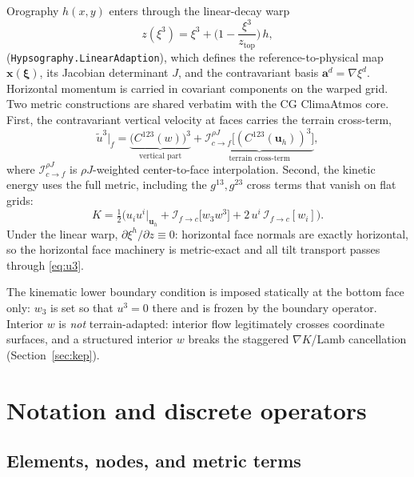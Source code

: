 \documentclass[11pt]{article}
\newcommand{\uu}{\boldsymbol{u}}
\newcommand{\uh}{\uu_h}
\begin{document}
Orography $h(x,y)$ enters through the linear-decay warp
\begin{equation}
z(\xi^3) = \xi^3 + \Big(1 - \frac{\xi^3}{z_{\mathrm{top}}}\Big)\,h,
\end{equation}
(\texttt{Hypsography.LinearAdaption}), which defines the reference-to-physical
map $\boldsymbol{x}(\boldsymbol{\xi})$, its Jacobian determinant $J$, and
the contravariant basis $\boldsymbol{a}^d = \nabla\xi^d$. Horizontal
momentum is carried in covariant components on the warped grid. Two
metric constructions are shared verbatim with the CG ClimaAtmos core.
First, the contravariant vertical velocity at faces carries the terrain
cross-term,
\begin{equation}
\tilde u^3\big|_f
 = \underbrace{\big(C^{123}(w)\big)^3}_{\text{vertical part}}
 + \underbrace{\mathcal{I}^{\rho J}_{c\to f}
   \big[(C^{123}(\uh))^3\big]}_{\text{terrain cross-term}},
\label{eq:u3}
\end{equation}
where $\mathcal{I}^{\rho J}_{c\to f}$ is $\rho J$-weighted center-to-face
interpolation. Second, the kinetic energy uses the full metric, including
the $g^{13}, g^{23}$ cross terms that vanish on flat grids:
\begin{equation}
K = \tfrac12\Big( u_i u^i \big|_{\uh}
 + \mathcal{I}_{f\to c}\big[w_3 w^3\big]
 + 2\, u^i \,\mathcal{I}_{f\to c}[w_i] \Big).
\label{eq:fullK}
\end{equation}
Under the linear warp, $\partial \xi^h/\partial z \equiv 0$: horizontal
face normals are exactly horizontal, so the horizontal face machinery is
metric-exact and all tilt transport passes through \eqref{eq:u3}.

The kinematic lower boundary condition is imposed statically at the
bottom face only: $w_3$ is set so that $u^3 = 0$ there and is frozen by
the boundary operator. Interior $w$ is \emph{not} terrain-adapted:
interior flow legitimately crosses coordinate surfaces, and a structured
interior $w$ breaks the staggered $\nabla K$/Lamb cancellation
(Section~\ref{sec:kep}).

\section{Notation and discrete operators}
\label{sec:notation}

\subsection{Elements, nodes, and metric terms}
\end{document}
